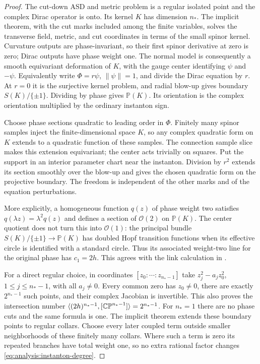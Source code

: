 \begin{proof}
The cut-down ASD and metric problem is a regular isolated point and
the complex Dirac operator is onto.  Its kernel $K$ has dimension
$n_*$.  The implicit theorem, with the cut marks included among the
finite variables, solves the transverse field, metric, and cut
coordinates in terms of the small spinor kernel.  Curvature outputs
are phase-invariant, so their first spinor derivative at zero is zero;
Dirac outputs have phase weight one.  The normal model is consequently
a smooth equivariant deformation of $K$, with the gauge center
identifying $\psi$ and $-\psi$.  Equivalently write
$\Phi=r\psi$, $\|\psi\|=1$, and divide the Dirac equation by $r$.
At $r=0$ it is the surjective kernel problem, and radial blow-up gives
boundary $S(K)/\{\pm1\}$.  Dividing by phase gives $\mathbb P(K)$.
Its orientation is the complex orientation multiplied by the ordinary
instanton sign.

Choose phase sections quadratic to leading order in $\Phi$.  Finitely
many spinor samples inject the finite-dimensional space $K$, so any
complex quadratic form on $K$ extends to a quadratic function of these
samples.  The connection sample slice makes this extension equivariant;
the center acts trivially on squares.  Put the support in an interior
parameter chart near the instanton.  Division by $r^2$ extends its
section smoothly over the blow-up and gives the chosen quadratic form
on the projective boundary.  The freedom is independent of the other
marks and of the equation perturbations.

More explicitly, a homogeneous function $q(z)$ of phase weight two
satisfies $q(\lambda z)=\lambda^2q(z)$ and defines a section of
$\mathcal O(2)$ on $\mathbb P(K)$.  The center quotient does not turn
this into $\mathcal O(1)$: the principal bundle
$S(K)/\{\pm1\}\to\mathbb P(K)$ has doubled Hopf transition
functions when its effective circle is identified with a standard
circle.  Thus its associated weight-two line for the original phase
has $c_1=2h$.  This agrees with the link calculation in
\cite[Lemma~3.28 and Proposition~3.29]{FeehanLenessPU2II}.

For a direct regular choice, in coordinates
$[z_0:\cdots:z_{n_*-1}]$ take
$z_j^2-a_jz_0^2$, $1\leq j\leq n_*-1$, with all $a_j\ne0$.
Every common zero has $z_0\ne0$, there are exactly $2^{n_*-1}$
such points, and their complex Jacobian is invertible.  This also
proves the intersection number
$\langle(2h)^{n_*-1},[\mathbb{CP}^{n_*-1}]\rangle=2^{n_*-1}$.
For $n_*=1$ there are no phase cuts and the same formula is one.
The implicit theorem extends these boundary points to regular collars.
Choose every later coupled term outside smaller neighborhoods of these
finitely many collars.  Where such a term is zero its repeated branches
have total weight one, so no extra rational factor changes
\eqref{eq:analysis:instanton-degree}.
\end{proof}

